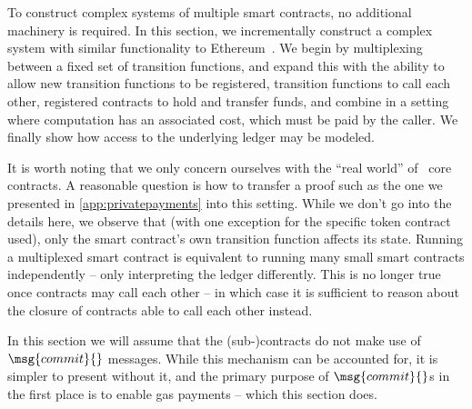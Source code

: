 To construct complex systems of multiple smart contracts, no additional
machinery is required. In this section, we incrementally construct a complex
system with similar functionality to Ethereum~\cite{ethereum}. We begin by
multiplexing between a fixed set of transition functions, and expand this with
the ability to allow new transition functions to be registered, transition
functions to call each other, registered contracts to hold and transfer funds,
and combine in a setting where computation has an associated
cost, which must be paid by the caller. We finally show how access to the
underlying ledger may be modeled.

It is worth noting that we only concern ourselves with the ``real world'' of
\kachina\ core contracts. A reasonable question is how to transfer a proof such as the
one we presented in \autoref{app:privatepayments} into this setting. While we
don't go into the details here, we observe that (with one exception for the
specific token contract used), only the smart contract's own transition function
affects its state. Running a multiplexed smart contract is equivalent to running
many small smart contracts independently -- only interpreting the ledger
differently. This is no longer true once contracts may call each other -- in
which case it is sufficient to reason about the closure of contracts able to
call each other instead.

In this section we will assume that the (sub-)contracts do not make use of
  $\msg{commit}{}$ messages. While this mechanism can be accounted for, it is
  simpler to present without it, and the primary purpose of $\msg{commit}{}$s in
the first place is to enable gas payments -- which this section does.

